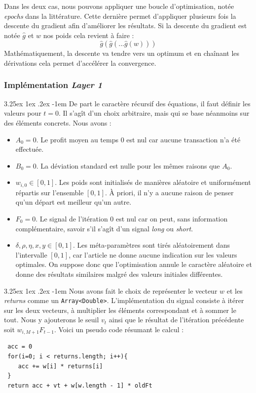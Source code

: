 \documentclass[a4paper, 11pt]{article}
\makeatletter
\renewcommand\paragraph{\@startsection{paragraph}{5}{\z@}%
  {3.25ex \@plus1ex \@minus.2ex}%
  {-1em}%
  {\normalfont\normalsize\bfseries}}
\makeatother
\begin{document}
Dans les deux cas, nous pouvons appliquer une boucle d'optimisation, notée \textit{epochs} dans la littérature. Cette dernière permet d'appliquer plusieurs
fois la descente du gradient afin d'améliorer les résultats. Si la descente du gradient est notée $\widehat{g}$ et $w$ nos poids cela revient à faire :
$$\widehat{g}(\widehat{g}(...\widehat{g}(w)))$$
Mathématiquement, la descente va tendre vers un optimum et en chaînant les dérivations cela permet d'accélérer la convergence.

\subsubsection{Implémentation \textit{Layer 1}}

\paragraph{}
De part le caractère récursif des équations, il faut définir les valeurs pour $t=0$. Il s'agît d'un choix arbitraire, mais qui se base néanmoins sur des
éléments concrets. Nous avons :
\begin{itemize}
 \item $A_0 = 0$. Le profit moyen au temps $0$ est nul car aucune transaction n'a été effectuée.
 \item $B_0 = 0$. La déviation standard est nulle pour les mêmes raisons que $A_0$.
 \item $w_{i,0} \in [0,1]$. Les poids sont initialisés de manières aléatoire et uniformément répartis sur l'ensemble $[0,1]$. À priori, il n'y a aucune raison
 de penser qu'un départ est meilleur qu'un autre.
 \item $F_0 = 0$. Le signal de l'itération 0 est nul car on peut, sans information complémentaire, savoir s'il s'agît d'un signal \textit{long} ou
 \textit{short}.
 \item $\delta,\rho,\eta,x,y \in [0,1]$. Les méta-paramètres sont tirés aléatoirement dans l'intervalle $[0,1]$, car l'article ne donne aucune
 indication sur les valeurs optimales. On suppose donc que l'optimisation annule le caractère aléatoire et donne des résultats similaires malgré des
 valeurs initiales différentes.
\end{itemize}

\paragraph{}
Nous avons fait le choix de représenter le vecteur $w$ et les \textit{returns} comme un \texttt{Array<Double>}. L'implémentation du signal
consiste à itérer sur les deux vecteurs, à multiplier les éléments correspondant et à sommer le tout. Nous y ajouterons le seuil $v_t$ ainsi que le 
résultat de l'itération précédente soit $w_{i,M+1} F_{t-1}$.
Voici un pseudo code résumant le calcul :
\begin{lstlisting}
 acc = 0
 for(i=0; i < returns.length; i++){
    acc += w[i] * returns[i]
 }
 return acc + vt + w[w.length - 1] * oldFt
\end{lstlisting}
\end{document}
